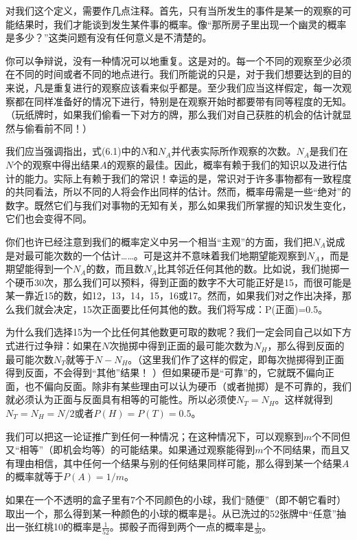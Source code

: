 对我们这个定义，需要作几点注释。首先，只有当所发生的事件是某一的观察的可能结果时，我们才能谈到发生某件事的概率。像“那所房子里出现一个幽灵的概率是多少？”这类问题有没有任何意义是不清楚的。

你可以争辩说，没有一种情况可以地重复。这是对的。每一个不同的观察至少必须在不同的时间或者不同的地点进行。我们所能说的只是，对于我们想要达到的目的来说，凡是重复进行的观察应该看来似乎都是。至少我们应当这样假定，每一次观察都在同样准备好的情况下进行，特别是在观察开始时都要带有同等程度的无知。（玩纸牌时，如果我们偷看一下对方的牌，那么我们对自己获胜的机会的估计就显然与偷看前不同！）

我们应当强调指出，式(6.1)中的$N$和$N_A$并代表实际所作观察的次数。$N_A$是我们在$N$个的观察中得出结果$A$的观察的最佳。因此，概率有赖于我们的知识以及进行估计的能力。实际上有赖于我们的常识！幸运的是，常识对于许多事物都有一致程度的共同看法，所以不同的人将会作出同样的估计。然而，概率毋需是一些“绝对”的数字。既然它们与我们对事物的无知有关，那么如果我们所掌握的知识发生变化，它们也会变得不同。

你们也许已经注意到我们的概率定义中另一个相当“主观”的方面，我们把$N_A$说成是对最可能次数的一个估计……。可是这并不意味着我们地期望能观察到$N_A$，而是期望能得到一个$N_A$的数，而且数$N_A$比其邻近任何其他的数。比如说，我们抛掷一个硬币$30$次，那么我们可以预料，得到正面的数字不大可能正好是15，而很可能是某一靠近15的数，如12，13，14，15，16或17。然而，如果我们对之作出决择，那么我们就会决定，15次正面要比任何其他的数。我们将写成：P(正面)=0.5。

为什么我们选择15为一个比任何其他数更可取的数呢？我们一定会同自己以如下方式进行过争辩：如果在$N$次抛掷中得到正面的最可能次数为$N_H$，那么得到反面的最可能次数$N_T$就等于$N-N_H$。（这里我们作了这样的假定，即每次抛掷得到正面得到反面，不会得到“其他”结果！ ）但如果硬币是“可靠”的，它就既不偏向正面，也不偏向反面。除非有某些理由可以认为硬币（或者抛掷）是不可靠的，我们就必须认为正面与反面具有相等的可能性。所以必须使$N_T=N_H$。这样就得到$N_T=N_H=N/2$或者$P(H)=P(T)=0.5$。

我们可以把这一论证推广到任何一种情况；在这种情况下，可以观察到$m$个不同但又“相等”（即机会均等）的可能结果。如果通过观察能得到$m$个不同结果，而且又有理由相信，其中任何一个结果与别的任何结果同样可能，那么得到某一个结果$A$的概率就等于$P(A)=1/m$。

如果在一个不透明的盒子里有7个不同颜色的小球，我们“随便”（即不朝它看时）取出一个，那么得到某一种颜色的小球的概率是$\frac{1}{7}$。从已洗过的52张牌中“任意”抽出一张红桃10的概率是$\frac{1}{52}$。掷骰子而得到两个一点的概率是$ \frac{1}{36} $。
\begin{center}
\makebox[200pt]{\hrulefill}
\end{center}

